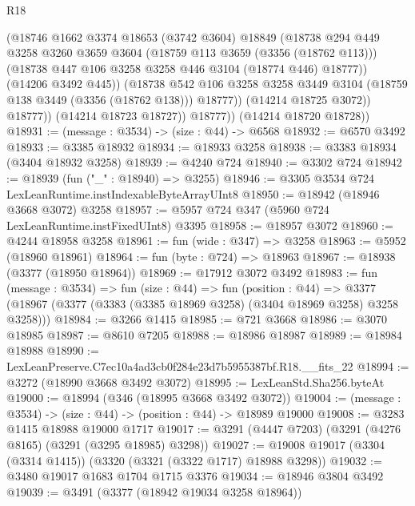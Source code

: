 \begin{lexlean}{R18}
\begin{coremodule}
                    (@18746
                      @1662
                      @3374
                      @18653
                      (@3742 @3604)
                      @18849
                      (@18738
                        @294
                        @449
                        @3258
                        @3260
                        @3659
                        @3604
                        (@18759 @113 @3659 (@3356 (@18762 @113)))
                        (@18738 @447 @106 @3258 @3258 @446 @3104 (@18774 @446) @18777))
                      (@14206 @3492 @445))
                    (@18738
                      @542
                      @106
                      @3258
                      @3258
                      @3449
                      @3104
                      (@18759 @138 @3449 (@3356 (@18762 @138)))
                      @18777))
                  (@14214 @18725 @3072))
                @18777))
            (@14214 @18723 @18727))
          @18777))
      (@14214 @18720 @18728))
@18931 := (message : @3534) -> (size : @44) -> @6568
@18932 := @6570 @3492
@18933 := @3385 @18932
@18934 := @18933 @3258
@18938 := @3383 @18934 (@3404 @18932 @3258)
@18939 := @4240 @724
@18940 := @3302 @724
@18942 := @18939 (fun ("_" : @18940) => @3255)
@18946 := @3305 @3534 @724 LexLeanRuntime.instIndexableByteArrayUInt8
@18950 := @18942 (@18946 @3668 @3072) @3258
@18957 := @5957 @724 @347 (@5960 @724 LexLeanRuntime.instFixedUInt8) @3395
@18958 := @18957 @3072
@18960 := @4244 @18958 @3258
@18961 := fun (wide : @347) => @3258
@18963 := @5952 (@18960 @18961)
@18964 := fun (byte : @724) => @18963
@18967 := @18938 (@3377 (@18950 @18964))
@18969 := @17912 @3072 @3492
@18983 := fun (message : @3534) =>
  fun (size : @44) =>
  fun (position : @44) =>
  @3377 (@18967 (@3377 (@3383 (@3385 @18969 @3258) (@3404 @18969 @3258) @3258 @3258)))
@18984 := @3266 @1415
@18985 := @721 @3668
@18986 := @3070 @18985
@18987 := @8610 @7205
@18988 := @18986 @18987
@18989 := @18984 @18988
@18990 := LexLeanPreserve.C7ec10a4ad3cb0f284e23d7b5955387bf.R18.__fits_22
@18994 := @3272 (@18990 @3668 @3492 @3072)
@18995 := LexLeanStd.Sha256.byteAt
@19000 := @18994 (@346 (@18995 @3668 @3492 @3072))
@19004 := (message : @3534) -> (size : @44) -> (position : @44) -> @18989 @19000
@19008 := @3283 @1415 @18988 @19000 @1717
@19017 := @3291 (@4447 @7203) (@3291 (@4276 @8165) (@3291 (@3295 @18985) @3298))
@19027 := @19008 @19017 (@3304 (@3314 @1415)) (@3320 (@3321 (@3322 @1717) @18988 @3298))
@19032 := @3480 @19017 @1683 @1704 @1715 @3376
@19034 := @18946 @3804 @3492
@19039 := @3491 (@3377 (@18942 @19034 @3258 @18964))

\end{coremodule}
\end{lexlean}
